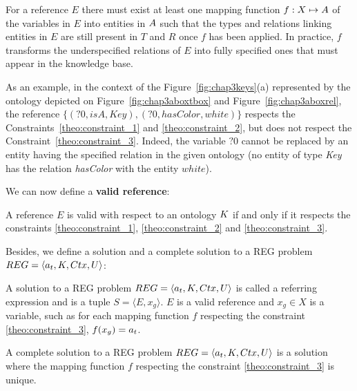 \documentclass[a4paper,11pt,twoside]{StyleThese}
\begin{document}
\begin{constraint}
\label{theo:constraint_3}
For a reference $E$ there must exist at least one mapping function $f: X \mapsto A$ of the variables in $E$ into entities in $A$ such that the types and relations linking entities in $E$ are still present in $T$ and $R$ once $f$ has been applied.
In practice, $f$ transforms the underspecified relations of $E$ into fully specified ones that must appear in the knowledge base.
\end{constraint}

As an example, in the context of the Figure~\ref{fig:chap3keys}(a) represented by the ontology depicted on Figure~\ref{fig:chap3aboxtbox} and Figure~\ref{fig:chap3aboxrel}, the reference $\{(?0, isA, Key), (?0, hasColor, white)\}$ respects the Constraints~\ref{theo:constraint_1} and \ref{theo:constraint_2}, but does not respect the Constraint~\ref{theo:constraint_3}. Indeed, the variable $?0$ cannot be replaced by an entity having the specified relation in the given ontology (no entity of type \textit{Key} has the relation \textit{hasColor} with the entity $white$).

We can now define a \textbf{valid reference}:

\begin{definition}
\label{theo:valid_ref}
A reference $E$ is valid with respect to an ontology $K$ if and only if it respects the constraints \ref{theo:constraint_1}, \ref{theo:constraint_2} and \ref{theo:constraint_3}.
\end{definition}

Besides, we define a solution and a complete solution to a REG problem $REG = \langle a_t, K, Ctx, U \rangle$:

\begin{definition}
\label{def:re}
A solution to a REG problem $REG = \langle a_t, K, Ctx, U \rangle$ is called a referring expression and is a tuple $S = \langle E, x_g \rangle$. $E$ is a valid reference and $x_g \in X$ is a variable, such as for each mapping function $f$ respecting the constraint \ref{theo:constraint_3}, $f(x_g) = a_t$.
\end{definition}

\begin{definition}
\label{def:complete_re}
A complete solution to a REG problem $REG = \langle a_t, K, Ctx, U \rangle$ is a solution where the mapping function $f$ respecting the constraint \ref{theo:constraint_3} is unique.
\end{definition}
\end{document}
